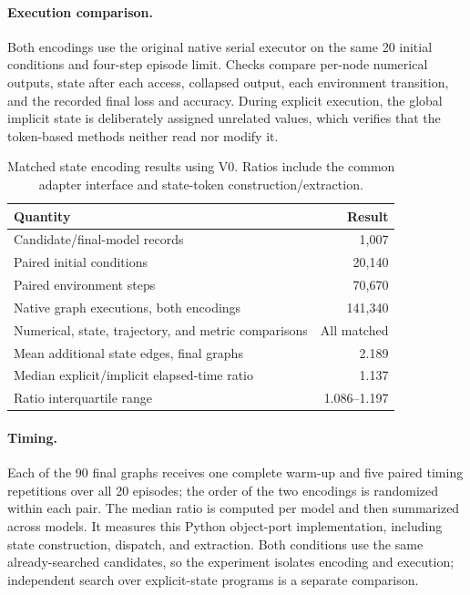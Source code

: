\paragraph{Execution comparison.}
Both encodings use the original native serial executor on the same 20 initial
conditions and four-step episode limit. Checks compare per-node numerical
outputs, state after each access, collapsed output, each environment transition,
and the recorded final loss and accuracy. During explicit execution, the global
implicit state is deliberately assigned unrelated values, which verifies that
the token-based methods neither read nor modify it.

\begin{table}[tb]
\centering
\small
\caption{Matched state encoding results using V0. Ratios include the common
adapter interface and state-token construction/extraction.}
\label{tab:revision_encoding_full}
\begin{tabular}{lr}
\toprule
Quantity & Result \\
\midrule
Candidate/final-model records & 1,007 \\
Paired initial conditions & 20,140 \\
Paired environment steps & 70,670 \\
Native graph executions, both encodings & 141,340 \\
Numerical, state, trajectory, and metric comparisons & All matched \\
Mean additional state edges, final graphs & 2.189 \\
Median explicit/implicit elapsed-time ratio & 1.137 \\
Ratio interquartile range & 1.086--1.197 \\
\bottomrule
\end{tabular}
\end{table}

\paragraph{Timing.}
Each of the 90 final graphs receives one complete warm-up and five paired timing
repetitions over all 20 episodes; the order of the two encodings is randomized
within each pair. The median ratio is computed per model and then summarized
across models. It measures this Python object-port implementation, including
state construction, dispatch, and extraction. Both conditions use the same
already-searched candidates, so the experiment isolates encoding and execution;
independent search over explicit-state programs is a separate comparison.

